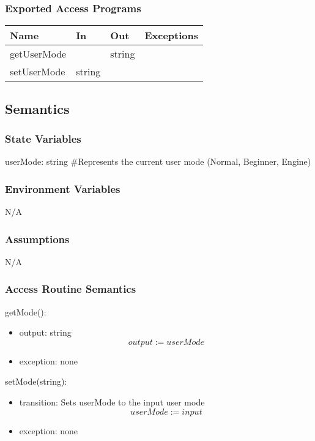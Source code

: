 \documentclass[12pt, titlepage]{article}
\begin{document}
    \subsubsection{Exported Access Programs}
        \begin{center}
        \begin{tabular}{p{4.5cm} p{4cm} p{3cm} p{2.5cm}}
        \hline
        \textbf{Name} & \textbf{In} & \textbf{Out} & \textbf{Exceptions} \\
        \hline
        getUserMode & & string & \\
        \hline
        setUserMode & string & & \\
        \hline
        \end{tabular}
        \end{center}

    \subsection{Semantics}
    \subsubsection{State Variables}
    userMode: string \#Represents the current user mode (Normal, Beginner, Engine)

    \subsubsection{Environment Variables}
    N/A

    \subsubsection{Assumptions}
    N/A

    \subsubsection{Access Routine Semantics}
        \noindent getMode():
        \begin{itemize}
            \item output: string 
                \[output := userMode\]
            \item exception: none
        \end{itemize}

        \noindent setMode(string):
        \begin{itemize}
            \item transition: Sets userMode to the input user mode 
                \[userMode := input\]
            \item exception: none
        \end{itemize}
\end{document}
